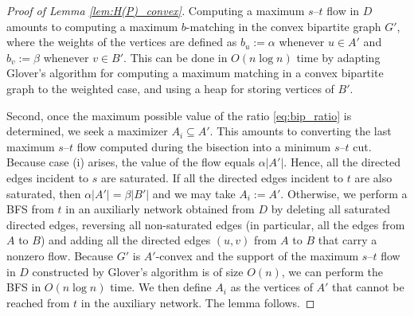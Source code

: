 \documentclass{article} \usepackage{fullpage}
\begin{document}
\begin{proof}[Proof of Lemma \ref{lem:H(P)_convex}]
Computing a maximum $s$--$t$ flow in $D$ amounts to computing a maximum $b$-matching in the convex bipartite graph $G'$, where the weights of the vertices are defined as $b_u := \alpha$ whenever $u \in A'$ and $b_v := \beta$ whenever $v \in B'$. This can be done in $O(n \log n)$ time by adapting Glover's algorithm for computing a maximum matching in a convex bipartite graph \cite{G67} to the weighted case, and using a heap for storing vertices of $B'$. 

Second, once the maximum possible value of the ratio \eqref{eq:bip_ratio} is determined, we seek a maximizer $A_i \subseteq A'$. This amounts to converting the last maximum $s$--$t$ flow computed during the bisection into a minimum $s$--$t$ cut. Because case (i) arises, the value of the flow equals $\alpha |A'|$. Hence, all the directed edges incident to $s$ are saturated. If all the directed edges incident to $t$ are also saturated, then $\alpha |A'| = \beta |B'|$ and we may take $A_i := A'$. Otherwise, we perform a BFS from $t$ in an auxiliarly network obtained from $D$ by deleting all saturated directed edges, reversing all non-saturated edges (in particular, all the edges from $A$ to $B$) and adding all the directed edges $(u,v)$ from $A$ to $B$ that carry a nonzero flow. Because $G'$ is $A'$-convex and the support of the maximum $s$--$t$ flow in $D$ constructed by Glover's algorithm is of size $O(n)$, we can perform the BFS in $O(n \log n)$ time. We then define $A_i$ as the vertices of $A'$ that cannot be reached from $t$ in the auxiliary network. The lemma follows.
\end{proof}
\end{document}
